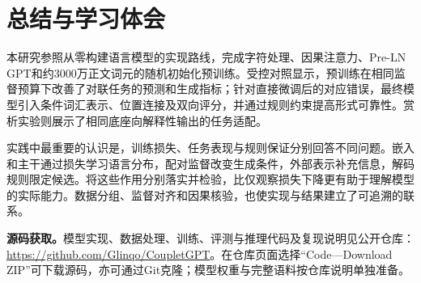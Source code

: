 \section{总结与学习体会}

本研究参照从零构建语言模型的实现路线，完成字符处理、因果注意力、Pre-LN GPT和约3000万正文词元的随机初始化预训练。受控对照显示，预训练在相同监督预算下改善了对联任务的预测和生成指标；针对直接微调后的对应错误，最终模型引入条件词汇表示、位置连接及双向评分，并通过规则约束提高形式可靠性。赏析实验则展示了相同底座向解释性输出的任务适配。

实践中最重要的认识是，训练损失、任务表现与规则保证分别回答不同问题。嵌入和主干通过损失学习语言分布，配对监督改变生成条件，外部表示补充信息，解码规则限定候选。将这些作用分别落实并检验，比仅观察损失下降更有助于理解模型的实际能力。数据分组、监督对齐和因果核验，也使实现与结果建立了可追溯的联系。

\noindent\textbf{源码获取。}模型实现、数据处理、训练、评测与推理代码及复现说明见公开仓库：\url{https://github.com/Glinqo/CoupletGPT}。在仓库页面选择“Code—Download ZIP”可下载源码，亦可通过Git克隆；模型权重与完整语料按仓库说明单独准备。
